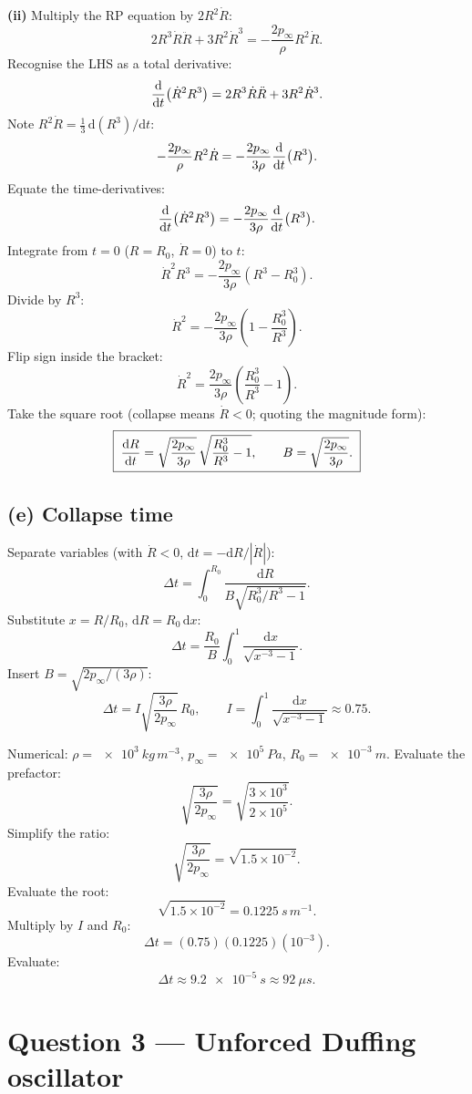 \documentclass[11pt]{article}
\newcommand{\de}{\mathrm{d}}
\begin{document}
\textbf{(ii)} Multiply the RP equation by $2R^2\dot R$:
\[ 2R^3 \dot R\ddot R + 3 R^2 \dot R^3 = -\frac{2 p_\infty}{\rho} R^2\dot R. \]
Recognise the LHS as a total derivative:
\[ \dv{t}\!\left(\dot R^2 R^3\right) = 2 R^3 \dot R \ddot R + 3 R^2 \dot R^3. \]
Note $R^2\dot R = \tfrac13\,\de(R^3)/\de t$:
\[ -\frac{2 p_\infty}{\rho} R^2 \dot R = -\frac{2 p_\infty}{3\rho}\dv{t}(R^3). \]
Equate the time-derivatives:
\[ \dv{t}\!\left(\dot R^2 R^3\right) = -\frac{2 p_\infty}{3\rho}\dv{t}(R^3). \]
Integrate from $t=0$ ($R=R_0$, $\dot R=0$) to $t$:
\[ \dot R^2 R^3 = -\frac{2 p_\infty}{3\rho}(R^3 - R_0^3). \]
Divide by $R^3$:
\[ \dot R^2 = -\frac{2 p_\infty}{3\rho}\!\left(1 - \frac{R_0^3}{R^3}\right). \]
Flip sign inside the bracket:
\[ \dot R^2 = \frac{2 p_\infty}{3\rho}\!\left(\frac{R_0^3}{R^3} - 1\right). \]
Take the square root (collapse means $\dot R<0$; quoting the magnitude form):
\[ \boxed{\;\dv{R}{t} = \sqrt{\frac{2 p_\infty}{3\rho}}\,\sqrt{\frac{R_0^3}{R^3}-1},\qquad B = \sqrt{\frac{2 p_\infty}{3\rho}}.\;} \]

\subsection*{(e) Collapse time}

Separate variables (with $\dot R<0$, $\de t = -\de R/|\dot R|$):
\[ \Delta t = \int_0^{R_0}\frac{\de R}{B\sqrt{R_0^3/R^3 - 1}}. \]
Substitute $x=R/R_0$, $\de R = R_0\,\de x$:
\[ \Delta t = \frac{R_0}{B}\int_0^1 \frac{\de x}{\sqrt{x^{-3}-1}}. \]
Insert $B = \sqrt{2p_\infty/(3\rho)}$:
\[ \boxed{\;\Delta t = I\sqrt{\frac{3\rho}{2 p_\infty}}\,R_0,\qquad I = \int_0^1\!\frac{\de x}{\sqrt{x^{-3}-1}}\approx 0.75.\;} \]

Numerical: $\rho = \SI{e3}{kg\,m^{-3}}$, $p_\infty = \SI{e5}{Pa}$, $R_0 = \SI{e-3}{m}$.
Evaluate the prefactor:
\[ \sqrt{\frac{3\rho}{2 p_\infty}} = \sqrt{\frac{3\times 10^3}{2\times 10^5}}. \]
Simplify the ratio:
\[ \sqrt{\frac{3\rho}{2 p_\infty}} = \sqrt{1.5\times 10^{-2}}. \]
Evaluate the root:
\[ \sqrt{1.5\times 10^{-2}} = \SI{0.1225}{s\,m^{-1}}. \]
Multiply by $I$ and $R_0$:
\[ \Delta t = (0.75)(0.1225)(10^{-3}). \]
Evaluate:
\[ \boxed{\;\Delta t \approx \SI{9.2e-5}{s} \approx \SI{92}{\mu s}.\;} \]

\section*{Question 3 --- Unforced Duffing oscillator}
\end{document}

